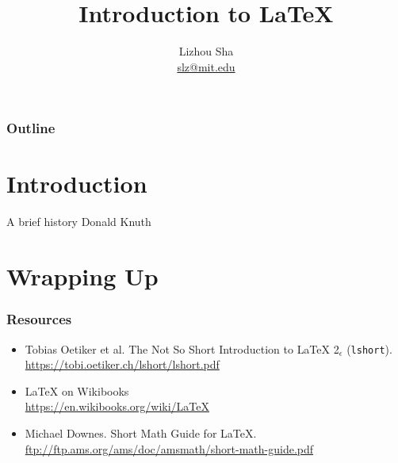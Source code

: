 \documentclass{beamer}
\title{Introduction to \rmfamily\LaTeX}
\author{Lizhou Sha\\\href{mailto:slz@mit.edu}{slz@mit.edu}}
\begin{document}
\frame{\titlepage}

\begin{frame}
\frametitle{Outline}
\tableofcontents[pausesections]
\end{frame}

\section{Introduction}

\begin{frame}{A brief history}
Donald Knuth
\end{frame}

\section{Wrapping Up}

\begin{frame}
\frametitle{Resources}
\begin{itemize}
    \item Tobias Oetiker et al. The Not So Short Introduction to {\rmfamily\LaTeX} 2$_{\epsilon}$ (\texttt{lshort}).\\
        \url{https://tobi.oetiker.ch/lshort/lshort.pdf}
    \item {\rmfamily\LaTeX} on Wikibooks\\
        \url{https://en.wikibooks.org/wiki/LaTeX}
    \item Michael Downes. Short Math Guide for {\rmfamily\LaTeX}.\\
        \url{ftp://ftp.ams.org/ams/doc/amsmath/short-math-guide.pdf}
\end{itemize}
\end{frame}
\end{document}
